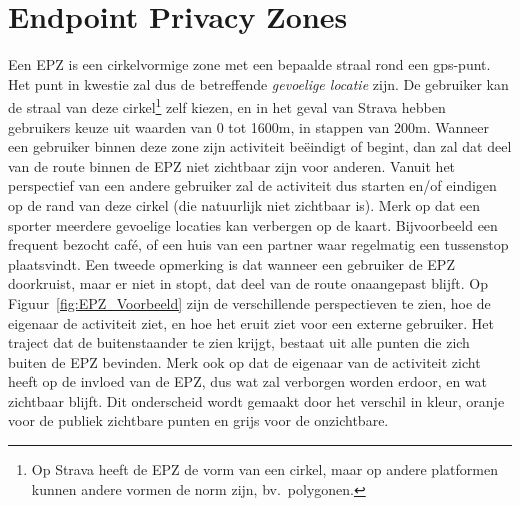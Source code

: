 \section{Endpoint Privacy Zones}\label{sec:EPZ}
Een \ac{EPZ} is een cirkelvormige zone met een bepaalde straal rond een
\ac{gps}-punt. Het punt in kwestie zal dus de betreffende \textit{gevoelige
    locatie} zijn. De gebruiker kan de straal van deze cirkel\footnote{Op Strava
    heeft de \ac{EPZ} de vorm van een cirkel, maar op andere platformen kunnen
    andere vormen de norm zijn, bv.\ polygonen.} zelf kiezen, en in het geval van
Strava hebben gebruikers keuze uit waarden van 0 tot 1600m, in stappen van
200m. Wanneer een gebruiker binnen deze zone zijn activiteit beëindigt of
begint, dan zal dat deel van de route binnen de \ac{EPZ} niet zichtbaar zijn
voor anderen. Vanuit het perspectief van een andere gebruiker zal de activiteit
dus starten en/of eindigen op de rand van deze cirkel (die natuurlijk niet
zichtbaar is). Merk op dat een sporter meerdere gevoelige locaties kan
verbergen op de kaart. Bijvoorbeeld een frequent bezocht café, of een huis van
een partner waar regelmatig een tussenstop plaatsvindt. Een tweede opmerking is
dat wanneer een gebruiker de \ac{EPZ} doorkruist, maar er niet in stopt, dat
deel van de route onaangepast blijft. Op Figuur~\ref{fig:EPZ_Voorbeeld} zijn de
verschillende perspectieven te zien, hoe de eigenaar de activiteit ziet, en hoe
het eruit ziet voor een externe gebruiker. Het traject dat de buitenstaander te
zien krijgt, bestaat uit alle punten die zich buiten de \ac{EPZ} bevinden. Merk
ook op dat de eigenaar van de activiteit zicht heeft op de invloed van de
\ac{EPZ}, dus wat zal verborgen worden erdoor, en wat zichtbaar blijft. Dit
onderscheid wordt gemaakt door het verschil in kleur, oranje voor de publiek
zichtbare punten en grijs voor de onzichtbare.
